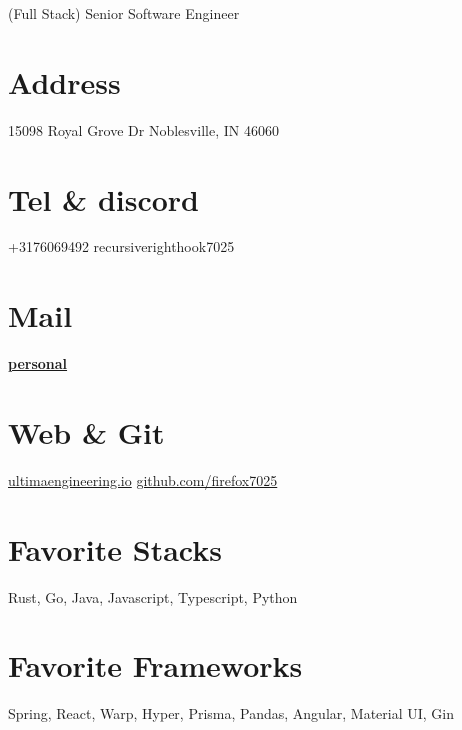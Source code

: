 \documentclass[]{friggeri-cv}
\begin{document}
      {(Full Stack) Senior Software Engineer}
      

\begin{aside}
  \section{Address}
    15098 Royal Grove Dr
    Noblesville, IN 46060
    ~
  \section{Tel \& discord}
    +3176069492
    recursiverighthook7025
    ~
  \section{Mail}
    \href{mailto:alexandermontgomery95@gmail.com}{\textbf{personal}}
    ~
  \section{Web \& Git}
    \href{http://www.ultimaengineering.io}{ultimaengineering.io}
    \href{https://github.com/firefox7025}{github.com/firefox7025}
  \section{Favorite Stacks}
    Rust, Go, Java, Javascript, Typescript, Python
    \section{Favorite Frameworks}
    Spring, React, Warp, Hyper, Prisma, Pandas, Angular, Material UI, Gin
\end{aside}
\end{document}
